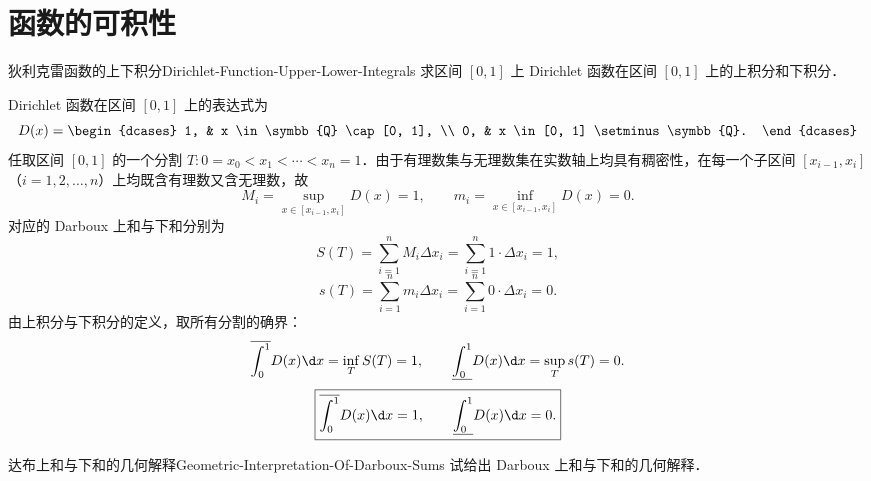 \section{函数的可积性}

\begin{problem}{狄利克雷函数的上下积分}{Dirichlet-Function-Upper-Lower-Integrals}
    求区间 $[0, 1]$ 上 Dirichlet 函数在区间 $[0, 1]$ 上的上积分和下积分．
\end{problem}

\begin{solution}
    Dirichlet 函数在区间 $[0, 1]$ 上的表达式为
    \begin{equation}
        D(x) = \begin{dcases}
            1, & x \in \symbb{Q} \cap [0, 1],      \\
            0, & x \in [0, 1] \setminus \symbb{Q}.
        \end{dcases}
    \end{equation}
    任取区间 $[0, 1]$ 的一个分割 $T : 0 = x_0 < x_1 < \cdots < x_n = 1$．由于有理数集与无理数集在实数轴上均具有稠密性，在每一个子区间 $[x_{i-1}, x_i]$（$i = 1, 2, \dots, n$）上均既含有理数又含无理数，故
    \begin{equation}
        M_i = \sup_{x\in [x_{i-1}, x_i]} D(x) = 1, \qquad m_i = \inf_{x\in [x_{i-1}, x_i]} D(x) = 0.
    \end{equation}
    对应的 Darboux 上和与下和分别为
    \begin{equation}
        S(T) = \sum_{i=1}^n M_i \Delta x_i = \sum_{i=1}^n 1 \cdot \Delta x_i = 1,
    \end{equation}
    \begin{equation}
        s(T) = \sum_{i=1}^n m_i \Delta x_i = \sum_{i=1}^n 0 \cdot \Delta x_i = 0.
    \end{equation}
    由上积分与下积分的定义，取所有分割的确界：
    \begin{equation}
        \overline{\int_0^1} D(x) \d x = \inf_{T} S(T) = 1, \qquad \underline{\int_0^1} D(x) \d x = \sup_{T} s(T) = 0.
    \end{equation}
    \begin{equation}
        \boxed{\overline{\int_0^1} D(x) \d x = 1, \qquad \underline{\int_0^1} D(x) \d x = 0.}
    \end{equation}
\end{solution}

\begin{problem}{达布上和与下和的几何解释}{Geometric-Interpretation-Of-Darboux-Sums}
    试给出 Darboux 上和与下和的几何解释．
\end{problem}

